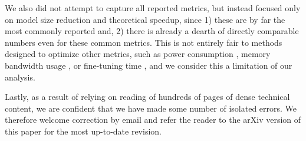 We also did not attempt to capture all reported metrics, but instead focused only on model size reduction and theoretical speedup, since 1) these are by far the most commonly reported and, 2) there is already a dearth of directly comparable numbers even for these common metrics. This is not entirely fair to methods designed to optimize other metrics, such as power consumption \cite{bayesian-compression, sze-energy-aware, learning-both, samsung-vbmf-tucker}, memory bandwidth usage \cite{extreme-net-compress, samsung-vbmf-tucker}, or fine-tuning time \cite{uiuc-coreset-pruning, pcas, sss, soft-filter-pruning}, and we consider this a limitation of our analysis.

Lastly, as a result of relying on reading of hundreds of pages of dense technical content, we are confident that we have made some number of isolated errors. We therefore welcome correction by email and refer the reader to the arXiv version of this paper for the most up-to-date revision.







